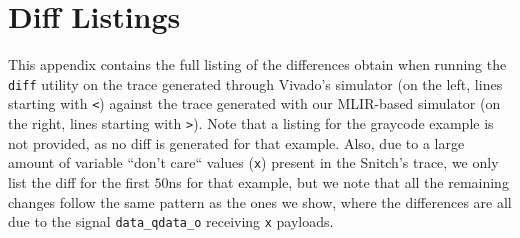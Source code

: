 \chapter{Diff Listings}
\label{app:diffs}

This appendix contains the full listing of the differences obtain when running the \texttt{diff} utility on the trace generated through Vivado's simulator (on the left, lines starting with \texttt{<}) against the trace generated with our MLIR-based simulator (on the right, lines starting with \texttt{>}). Note that a listing for the graycode example is not provided, as no diff is generated for that example. Also, due to a large amount of variable “don't care“ values (\texttt{x}) present in the Snitch's trace, we only list the diff for the first $50$ns for that example, but we note that all the remaining changes follow the same pattern as the ones we show, where the differences are all due to the signal \texttt{data\_qdata\_o} receiving \texttt{x} payloads.





